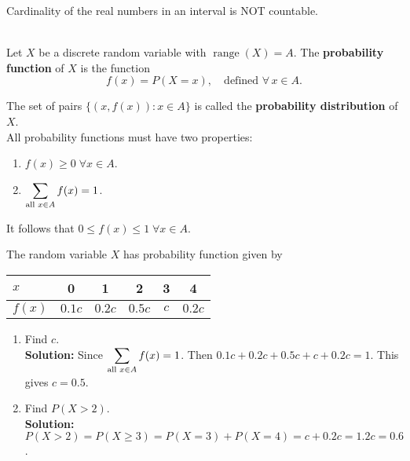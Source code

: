 \begin{note}
    Cardinality of the real numbers in an interval is NOT countable.
\end{note}

\begin{definition}
    \phantom{}  \\
    Let $X$ be a discrete random variable with
    $\operatorname{range}{(X)} = A$. The \textbf{probability function} of $X$ is the function
    \[f(x) = P(X = x), \quad \text{defined $\forall \, x \in A$.}\]

    The set of pairs $\{(x, f(x)) : x \in A\}$ is called the \textbf{probability distribution} of $X$.  \\
    All probability functions must have two properties:
    \begin{enumerate}
        \item $f(x) \geq 0 \; \forall x \in A$.
        \item $\displaystyle \sum_{\text{all } x \in A} f(x) =1$.
    \end{enumerate}
\end{definition}

\begin{remark}
    It follows that $0 \leq f(x) \leq 1 \; \forall x \in A$.
\end{remark}

\begin{example}
    The random variable $X$ has probability function given by \vspace{-5mm} \\
    \begin{center}
        \begin{tabular}{l|*{5}{c}}
            $x$ & 0 & 1 & 2 & 3 & 4 \\
            \hline
            $f(x)$ & $0.1c$ & $0.2c$ & $0.5c$ & $c$ & $0.2c$ \\
        \end{tabular}
    \end{center}
    
    \begin{enumerate}[label=(\alph*)]
        \item Find $c$. \\
        \textbf{Solution:} Since $\displaystyle \sum_{\text{all } x \in A} f(x) =1$. Then $0.1c + 0.2c + 0.5c + c + 0.2c = 1$.
        This gives $c = 0.5$.
        \item Find $P(X > 2)$. \\
        \textbf{Solution:} $P(X > 2) = P(X \geq 3) = P(X = 3) + P(X = 4) = c + 0.2c = 1.2c = 0.6$.
    \end{enumerate}
\end{example}

